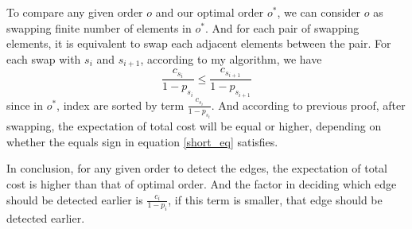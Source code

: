 \documentclass[twoside]{article}
\begin{document}
To compare any given order $o$ and our optimal order $o^*$, we can consider $o$ as swapping finite number of elements in $o^*$. And for each pair of swapping elements, it is equivalent to swap each adjacent elements between the pair. For each swap with $s_i$ and $s_{i+1}$, according to my algorithm, we have
\begin{equation} \label{short_eq}
    \frac{c_{s_i}}{1-p_{s_i}} \le \frac{c_{s_{i+1}}}{1-p_{s_{i+1}}}
\end{equation}
since in $o^*$, index are sorted by term $\frac{c_{s_i}}{1-p_{s_i}}$. And according to previous proof, after swapping, the expectation of total cost will be equal or higher, depending on whether the equals sign in equation \ref{short_eq} satisfies.

In conclusion, for any given order to detect the edges, the expectation of total cost is higher than that of optimal order. And the factor in deciding which edge should be detected earlier is $\frac{c_{i}}{1-p_{i}}$, if this term is smaller, that edge should be detected earlier.
\end{document}
